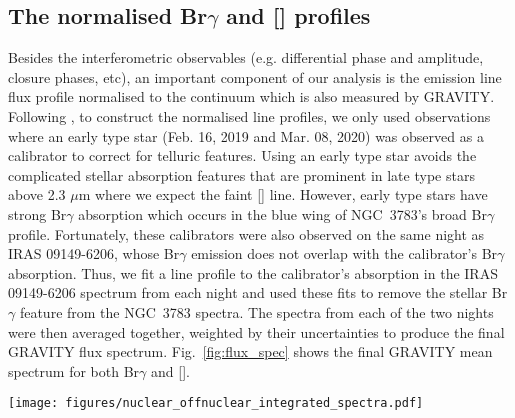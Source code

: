 \documentclass[longauth,]{aa}
\newcommand{\micron}{{\mbox{$\mu$m}}}
\newcommand{\brg}{Br$\gamma$}
\newcommand{\caviii}{[\ion{Ca}{viii}]}
\begin{document}
\subsection{The normalised \brg{} and \caviii{} profiles}
Besides the interferometric observables (e.g. differential phase and amplitude, closure phases, etc), an important component of our analysis is the emission line flux profile normalised to the continuum which is also measured by GRAVITY. Following , to construct the normalised line profiles, we only used observations where an early type star (Feb. 16, 2019 and Mar. 08, 2020) was observed as a calibrator to correct for telluric features. Using an early type star avoids the complicated stellar absorption features that are prominent in late type stars above 2.3 \micron{} where we expect the faint \caviii{} line. However, early type stars have strong \brg{} absorption which occurs in the blue wing of NGC~3783's broad \brg{} profile. Fortunately, these calibrators were also observed on the same night as IRAS 09149-6206, whose \brg{} emission does not overlap with the calibrator's \brg{} absorption. Thus, we fit a line profile to the calibrator's absorption in the IRAS 09149-6206 spectrum from each night and used these fits to remove the stellar \brg{} feature from the NGC~3783 spectra. The spectra from each of the two nights were then averaged together, weighted by their uncertainties to produce the final GRAVITY flux spectrum. Fig.~\ref{fig:flux_spec} shows the final GRAVITY mean spectrum for both \brg{} and \caviii{}.

\begin{figure*}
    \centering
    \texttt{[image: figures/nuclear\_offnuclear\_integrated\_spectra.pdf]}
    \caption{\textit{Left:} Example spectra extracted from the SINFONI cube including the full integrated spectrum (blue), a spectrum from a nuclear spaxel (green), and an integrated spectrum from an off-nuclear region (orange). All spectra have been normalized by their median flux and slightly offset to improve visualisation. \textit{Right:} K-band continuum image created by integrating the SINFONI cube between 2.25 and 2.31 \micron. The green cross indicates the spaxel used for the nuclear spectrum in the right panel. The orange circle indicates the aperture used for the off-nuclear spectrum.}
    \label{fig:sinfo_spec}
\end{figure*}
\end{document}
